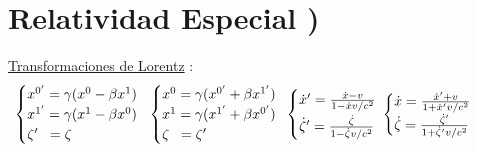 \section*{Relatividad Especial )}
    \underline{Transformaciones de Lorentz} : 
\begin{align*}
\hspace{-15pt}
&\begin{cases} 
x^{0'} =\gamma (x^0 -\beta x^1)
\\
x^{1'}=\gamma (x^1-\beta x^0)
\\
\zeta' \; \; = \zeta
\end{cases}
\hspace{-12pt}
&\begin{cases} 
x^{0} =\gamma (x^{0'} +\beta x^{1'})
\\
x^{1}=\gamma (x^{1'}+\beta x^{0'})
\\
\zeta \;\;= \zeta'
\end{cases}
\hspace{-5pt}
&\begin{cases} 
\dot{x}' =\tfrac{\dot{x}-v}{1-\dot{x}v/c^2 }
\vspace{3pt} \\
\dot{\zeta}' =\tfrac{\dot{\zeta}}{1-\dot{\zeta} v/c^2}
\end{cases}\hspace{-16pt}
&\begin{cases} 
\dot{x} =\tfrac{\dot{x}'+v}{1+\dot{x}' v/c^2 }
\vspace{1pt} \\
\dot{\zeta} =\tfrac{\dot{\zeta}'}{1+\dot{\zeta}' v/c^2}
\end{cases}
\end{align*}
\vspace{-5pt}
